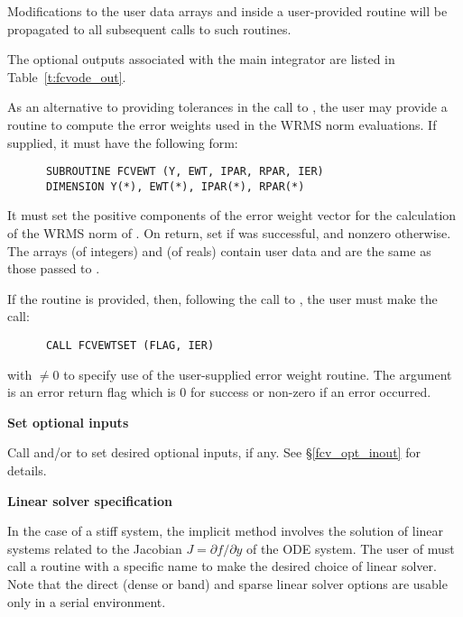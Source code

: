 \begin{Steps}
{    Modifications to the user data arrays  and  inside a 
    user-provided routine will be propagated to all subsequent calls to
    such routines.

    The optional outputs associated with the main {\cvode} integrator
    are listed in Table~\ref{t:fcvode_out}.
  }

  As an alternative to providing tolerances in the call to , the
  user may provide a routine to compute the error weights used in the WRMS norm
  evaluations. If supplied, it must have the following form:
\begin{verbatim}
      SUBROUTINE FCVEWT (Y, EWT, IPAR, RPAR, IER)
      DIMENSION Y(*), EWT(*), IPAR(*), RPAR(*)
\end{verbatim}
  It must set the positive components of the error weight vector  for
  the calculation of the WRMS norm of . On return, set
   if  was successful, and nonzero otherwise.
  The arrays  (of integers) and  (of reals) contain user data
  and are the same as those passed to .

  If the  routine is provided, then, 
  following the call to , the user must make the call:
\begin{verbatim}
      CALL FCVEWTSET (FLAG, IER)
\end{verbatim}
  with  $\neq 0$ to specify use of the user-supplied error weight routine.
  The argument  is an error return flag which is $0$ 
  for success or non-zero if an error occurred.

\item\label{i:fcv_opt_input}{\bf Set optional inputs} 

  Call  and/or  to set desired optional inputs,
  if any.  See \S\ref{fcv_opt_inout} for details.

\item\label{i:fcvode_lin_solv_spec} {\bf Linear solver specification} 
  
  In the case of a stiff system, the implicit  method involves the solution
  of linear systems related to the Jacobian $J = \partial f / \partial y$
  of the ODE system.  The user of {\fcvode} must call a routine with a specific
  name to make the desired choice of linear solver.
  Note that the direct (dense or band) and sparse linear solver options are
  usable only in a serial environment.



\end{Steps}
